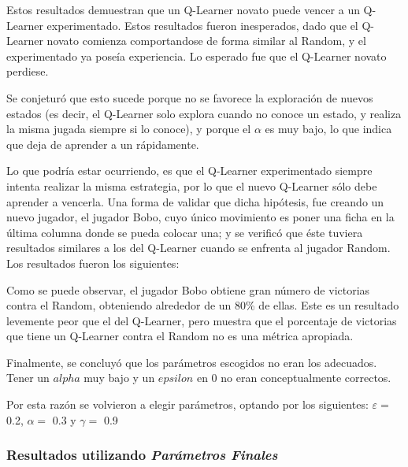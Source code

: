 
Estos resultados demuestran que un Q-Learner novato puede vencer a un Q-Learner experimentado.
Estos resultados fueron inesperados, dado que el Q-Learner novato comienza comportandose de forma similar al Random, y el experimentado ya poseía experiencia. Lo esperado fue que el Q-Learner novato perdiese.

Se conjeturó que esto sucede porque no se favorece la exploración de nuevos estados (es decir, el Q-Learner solo explora cuando no conoce un estado, y realiza la misma jugada siempre si lo conoce), y porque el $\alpha$ es muy bajo, lo que indica que deja de aprender a un rápidamente.

Lo que podría estar ocurriendo, es que el Q-Learner experimentado siempre intenta realizar la misma estrategia, por lo que el nuevo Q-Learner sólo debe aprender a vencerla.
Una forma de validar que dicha hipótesis, fue creando un nuevo jugador, el jugador Bobo, cuyo único movimiento es poner una ficha en la última columna donde se pueda colocar una; y se verificó que éste tuviera resultados similares a los del Q-Learner cuando se enfrenta al jugador Random.
Los resultados fueron los siguientes:


Como se puede observar, el jugador Bobo obtiene gran número de victorias contra el Random, obteniendo alrededor de un 80\% de ellas.
Este es un resultado levemente peor que el del Q-Learner, pero muestra que el porcentaje de victorias que tiene un Q-Learner contra el Random no es una métrica apropiada.

Finalmente, se concluyó que los parámetros escogidos no eran los adecuados. Tener un $alpha$ muy bajo y un $epsilon$ en 0 no eran conceptualmente correctos.

Por esta razón se volvieron a elegir parámetros, optando por los siguientes: $\varepsilon = $ 0.2, $\alpha = $ 0.3 y $\gamma = $ 0.9

\subsubsection{Resultados utilizando \emph{Parámetros Finales}}

